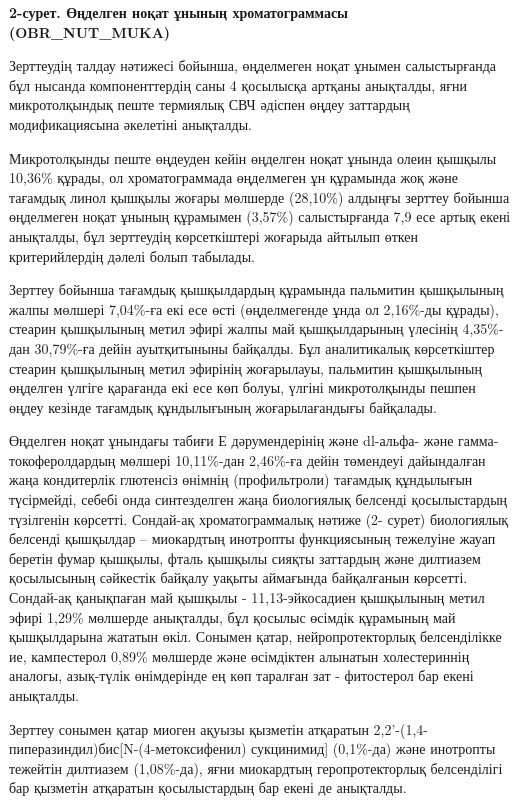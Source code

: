 {\bfseries 2-сурет. Өңделген ноқат ұнының хроматограммасы (OBR\_NUT\_MUKA)}

Зерттеудің талдау нәтижесі бойынша, өңделмеген ноқат ұнымен
салыстырғанда бұл нысанда компоненттердің саны 4 қосылысқа артқаны
анықталды, яғни микротолқындық пеште термиялық СВЧ әдіспен өңдеу
заттардың модификациясына әкелетіні анықталды.

Микротолқынды пеште өңдеуден кейін өңделген ноқат ұнында олеин қышқылы
10,36\% құрады, ол хроматограммада өңделмеген ұн құрамында жоқ және
тағамдық линол қышқылы жоғары мөлшерде (28,10\%) алдыңғы зерттеу бойынша
өңделмеген ноқат ұнының құрамымен (3,57\%) салыстырғанда 7,9 есе артық
екені анықталды, бұл зерттеудің көрсеткіштері жоғарыда айтылып өткен
критерийлердің дәлелі болып табылады.

Зерттеу бойынша тағамдық қышқылдардың құрамында пальмитин қышқылының
жалпы мөлшері 7,04\%-ға екі есе өсті (өңделмегенде ұнда ол 2,16\%-ды
құрады), стеарин қышқылының метил эфирі жалпы май қышқылдарының үлесінің
4,35\%-дан 30,79\%-ға дейін ауытқитыныны байқалды. Бұл аналитикалық
көрсеткіштер стеарин қышқылының метил эфирінің жоғарылауы, пальмитин
қышқылының өңделген үлгіге қарағанда екі есе көп болуы, үлгіні
микротолқынды пешпен өңдеу кезінде тағамдық құндылығының жоғарылағандығы
байқалады.

Өңделген ноқат ұнындағы табиғи Е дәрумендерінің және dl-альфа- және
гамма-токоферолдардың мөлшері 10,11\%-дан 2,46\%-ға дейін төмендеуі
дайындалған жаңа кондитерлік глютенсіз өнімнің (профильтроли) тағамдық
құндылығын түсірмейді, себебі онда синтезделген жаңа биологиялық
белсенді қосылыстардың түзілгенін көрсетті. Сондай-ақ хроматограммалық
нәтиже (2- сурет) биологиялық белсенді қышқылдар -- миокардтың инотропты
функциясының тежелуіне жауап беретін фумар қышқылы, фталь қышқылы сияқты
заттардың және дилтиазем қосылысының сәйкестік байқалу уақыты аймағында
байқалғанын көрсетті. Сондай-ақ қанықпаған май қышқылы -
11,13-эйкосадиен қышқылының метил эфирі 1,29\% мөлшерде анықталды, бұл
қосылыс өсімдік құрамының май қышқылдарына жататын өкіл. Сонымен қатар,
нейропротекторлық белсенділікке ие, кампестерол 0,89\% мөлшерде және
өсімдіктен алынатын холестериннің аналогы, азық-түлік өнімдерінде ең көп
таралған зат - фитостерол бар екені анықталды.

Зерттеу сонымен қатар миоген ақуызы қызметін атқаратын
2,2'-(1,4-пиперазиндил)бис{[}N-(4-метоксифенил)
сукцинимид{]} (0,1\%-да) және инотропты тежейтін дилтиазем (1,08\%-да),
яғни миокардтың геропротекторлық белсенділігі бар қызметін атқаратын
қосылыстардың бар екені де анықталды.

